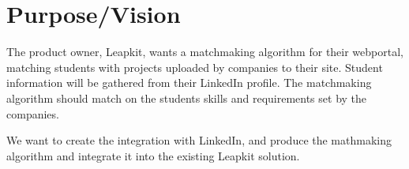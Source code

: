 \section{Purpose/Vision}

The product owner, Leapkit, wants a matchmaking algorithm for their webportal, matching students with projects uploaded by companies to their site. Student information will be gathered from their LinkedIn profile. The matchmaking algorithm should match on the students skills and requirements set by the companies.

We want to create the integration with LinkedIn, and produce the mathmaking algorithm and integrate it into the existing Leapkit solution.


